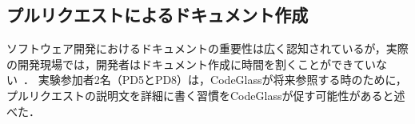 


\subsection*{プルリクエストによるドキュメント作成}

ソフトウェア開発におけるドキュメントの重要性は広く認知されているが，実際の開発現場では，開発者はドキュメント作成に時間を割くことができていない~\cite{A_Study_of_the_Documentation_Essential_to_Software_Maintenance}．
実験参加者2名（PD5とPD8）は，CodeGlassが将来参照する時のために，プルリクエストの説明文を詳細に書く習慣をCodeGlassが促す可能性があると述べた．




